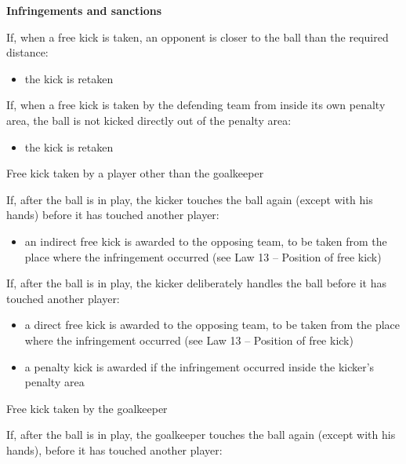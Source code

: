 \bigskip

{\bfseries Infringements and sanctions}

\headlinebox

If, when a free kick is taken, an opponent is closer to the ball than the required distance:

\begin{itemize}
\item the kick is retaken
\end{itemize}

\bigskip

If, when a free kick is taken by the defending team from inside its own penalty area, the ball is not kicked directly out of the penalty area:


\begin{itemize}
\item the kick is retaken
\end{itemize}

\bigskip

Free kick taken by a player other than the goalkeeper

If, after the ball is in play, the kicker touches the ball again (except with his hands) before it has touched another player:

\begin{itemize}
\item an indirect free kick is awarded to the opposing team, to be taken from the place where the infringement occurred (see Law 13 -- Position of free kick)
\end{itemize}

\bigskip

If, after the ball is in play, the kicker deliberately handles the ball before it has touched another player:

\begin{itemize}
\item a direct free kick is awarded to the opposing team, to be taken from the place where the infringement occurred (see Law 13 -- Position of free kick)
\item a penalty kick is awarded if the infringement occurred inside the kicker's penalty area
\end{itemize}

\bigskip

Free kick taken by the goalkeeper

If, after the ball is in play, the goalkeeper touches the ball again (except with his hands), before it has touched another player:

